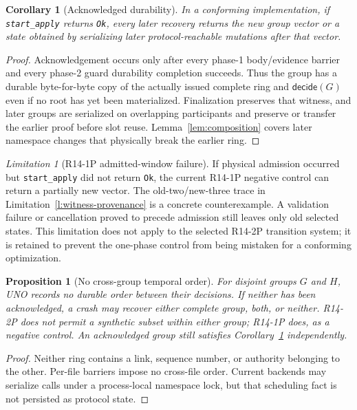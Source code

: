 \documentclass[10pt,twocolumn]{article}
\newtheorem{corollary}{Corollary}
\newtheorem{proposition}{Proposition}
\theoremstyle{remark}
\newtheorem{limitation}{Limitation}
\newcommand{\code}[1]{\texttt{#1}}
\begin{document}
\begin{corollary}[Acknowledged durability]\label{cor:ack}
In a conforming implementation, if \code{start\_apply} returns \code{Ok}, every later recovery
returns the new group vector or a state obtained by serializing later protocol-reachable mutations
after that vector.
\end{corollary}
\begin{proof}
Acknowledgement occurs only after every phase-1 body/evidence barrier and every phase-2 guard
durability completion succeeds. Thus the group has a durable byte-for-byte copy of the actually
issued complete ring and $\mathsf{decide}(G)$ even if no root has yet been materialized.
Finalization preserves that witness, and later groups are serialized on overlapping participants
and preserve or transfer the earlier proof before slot reuse. Lemma~\ref{lem:composition} covers
later namespace changes that physically break the earlier ring.
\end{proof}

\begin{limitation}[R14-1P admitted-window failure]\label{l:admitted-window}
If physical admission occurred but \code{start\_apply} did not return \code{Ok}, the current
R14-1P negative control can return a partially new vector. The old-two/new-three trace in
Limitation~\ref{l:witness-provenance} is a concrete counterexample. A validation failure or
cancellation proved to precede admission still leaves only old selected states. This limitation
does not apply to the selected R14-2P transition system; it is retained to prevent the one-phase
control from being mistaken for a conforming optimization.
\end{limitation}

\begin{proposition}[No cross-group temporal order]
For disjoint groups $G$ and $H$, UNO records no durable order between their decisions. If neither
has been acknowledged, a crash may recover either complete group, both, or neither. R14-2P does not
permit a synthetic subset within either group; R14-1P does, as a negative control. An acknowledged
group still satisfies Corollary~\ref{cor:ack} independently.
\end{proposition}
\begin{proof}
Neither ring contains a link, sequence number, or authority belonging to the other. Per-file
barriers impose no cross-file order. Current backends may serialize calls under a process-local
namespace lock, but that scheduling fact is not persisted as protocol state.
\end{proof}
\end{document}
